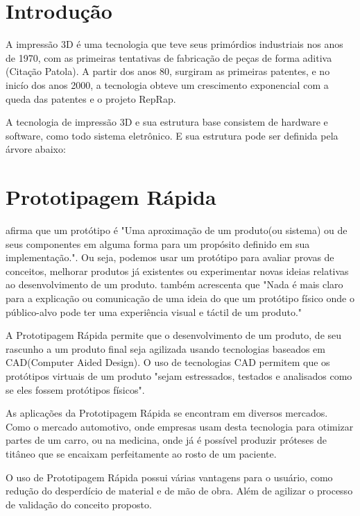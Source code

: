 \section{Introdução}
A impressão 3D é uma tecnologia que teve seus primórdios industriais nos anos de 1970,
com as primeiras tentativas de fabricação de peças de forma aditiva (Citação Patola).
A partir dos anos 80, surgiram as primeiras patentes, e no inicío dos anos 2000,
a tecnologia obteve um crescimento exponencial com a queda das patentes e o projeto RepRap.

A tecnologia de impressão 3D e sua estrutura base consistem de hardware e software,
como todo sistema eletrônico. E sua estrutura pode ser definida pela árvore abaixo:
\newline



\newpage

\section{Prototipagem Rápida}
\citet{rapidproto} afirma que um protótipo é "Uma aproximação de um produto(ou sistema)
ou de seus componentes em alguma forma para um propósito definido em sua implementação.".
Ou seja, podemos usar um protótipo para avaliar provas de conceitos, melhorar produtos
já existentes ou experimentar novas ideias relativas ao desenvolvimento de um produto.
\citet{rapidproto} também acrescenta que "Nada é mais claro para a explicação ou comunicação
de uma ideia do que um protótipo físico onde o público-alvo pode ter uma experiência visual
e táctil de um produto."

A Prototipagem Rápida permite que o desenvolvimento de um produto, de seu rascunho
a um produto final seja agilizada usando tecnologias baseados em CAD(Computer Aided Design).
O uso de tecnologias CAD permitem que os protótipos virtuais de um produto
\citet{rapidproto} "sejam estressados, testados e analisados como se eles fossem protótipos físicos".

As aplicações da Prototipagem Rápida se encontram em diversos mercados. Como o mercado
automotivo, onde empresas usam desta tecnologia para otimizar partes de um carro, ou na medicina,
onde já é possível produzir próteses de titâneo que se encaixam perfeitamente ao rosto de um paciente.

O uso de Prototipagem Rápida possui várias vantagens para o usuário, como redução do desperdício
de material e de mão de obra. Além de agilizar o processo de validação do conceito proposto.


